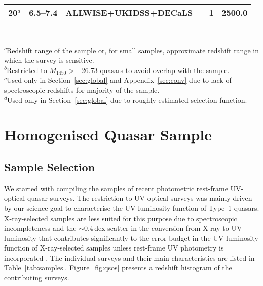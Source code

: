 \documentclass[fleqn,usenatbib]{mnras}
\begin{document}
\begin{table*}
\begin{tabular}{lcllrS}
    20$^d$ & 6.5--7.4 & ALLWISE+UKIDSS+DECaLS & \citet{2018Natur.553..473B} & 1 & 2500.0 \\
    \hline
  \end{tabular}\\
  \begin{minipage}{14.5cm}
   \textsuperscript{$c$}{Redshift range of the sample or, for small samples, approximate redshift range in which the survey is sensitive.}\\
  \textsuperscript{$b$}{Restricted to $M_{1450}>-26.73$ quasars to avoid overlap with the \citet{2016ApJ...829...33Y} sample.}\\
 \textsuperscript{$c$}{Used only in Section~\ref{sec:global} and Appendix~\ref{sec:conv} due to lack of spectroscopic redshifts for majority of the sample.}\\
 \textsuperscript{$d$}{Used only in Section~\ref{sec:global} due to roughly estimated selection function.}
 \end{minipage}
\end{table*}

\section{Homogenised Quasar Sample}
\label{sec:sample}

\subsection{Sample Selection}

We started with compiling the samples of recent photometric rest-frame UV-optical
quasar surveys. The restriction to UV-optical surveys was mainly
driven by our science goal to characterise the UV luminosity function
of Type~1 quasars. X-ray-selected samples are less suited for this
purpose due to spectroscopic incompleteness and the $\sim 0.4$\,dex
scatter in the conversion from X-ray to UV luminosity
\citep{2010A&A...512A..34L, 2015MNRAS.453.1946G, 2016ApJ...819..154L}
that contributes significantly to the error budget in the UV
luminosity function of X-ray-selected samples unless rest-frame UV
photometry is incorporated \citep{2015AA...578A..83G}.  The individual
surveys and their main characteristics are listed in
Table~\ref{tab:samples}.  Figure~\ref{fig:qsos} presents a redshift
histogram of the contributing surveys.
\end{document}
